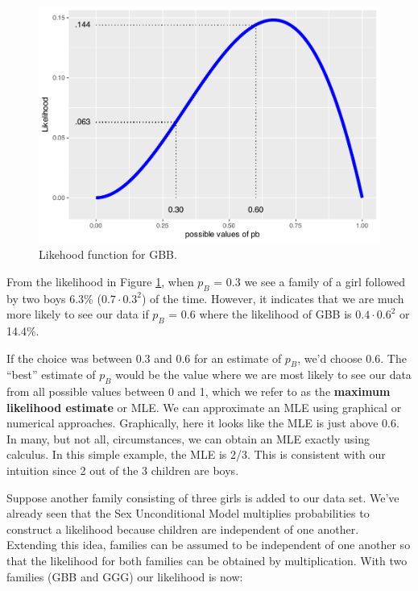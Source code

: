 \documentclass[
]{krantz}
\begin{document}
\begin{figure}

{\centering \includegraphics[width=0.9\linewidth]{bookdown-BeyondMLR_files/figure-latex/lik1-1} 

}

\caption{Likehood function for GBB.}\label{fig:lik1}
\end{figure}

From the likelihood in Figure \ref{fig:lik1}, when \(p_B\) = 0.3 we see a family of a girl followed by two boys 6.3\% (\(0.7\cdot0.3^2\)) of the time. However, it indicates that we are much more likely to see our data if \(p_B\) = 0.6 where the likelihood of GBB is \(0.4\cdot0.6^2\) or 14.4\%.

If the choice was between 0.3 and 0.6 for an estimate of \(p_B\), we'd choose 0.6. The ``best'' estimate of \(p_B\) would be the value where we are most likely to see our data from all possible values between 0 and 1, which we refer to as the \textbf{maximum likelihood estimate} or MLE.  We can approximate an MLE using graphical or numerical approaches. Graphically, here it looks like the MLE is just above 0.6. In many, but not all, circumstances, we can obtain an MLE exactly using calculus. In this simple example, the MLE is 2/3. This is consistent with our intuition since 2 out of the 3 children are boys.

Suppose another family consisting of three girls is added to our data set. We've already seen that the Sex Unconditional Model multiplies probabilities to construct a likelihood because children are independent of one another. Extending this idea, families can be assumed to be independent of one another so that the likelihood for both families can be obtained by multiplication. With two families (GBB and GGG) our likelihood is now:
\end{document}
